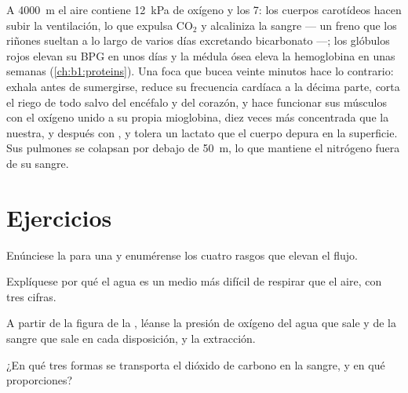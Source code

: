 \begin{example}\label{ex:b1:gas-exchange:altitudediving}
A \qty{4000}{m} el aire contiene \qty{12}{kPa} de oxígeno y los 
\qty{7}{}: los cuerpos carotídeos hacen subir la ventilación, lo que expulsa
$\mathrm{CO_2}$ y alcaliniza la sangre --- un freno que los riñones sueltan
a lo largo de varios días excretando bicarbonato ---; los glóbulos rojos
elevan su BPG en unos días y la médula ósea eleva la hemoglobina en unas
semanas (\cref{ch:b1:proteins}). Una foca que bucea veinte minutos hace lo
contrario: exhala antes de sumergirse, reduce su frecuencia cardíaca a la
décima parte, corta el riego de todo salvo del encéfalo y del corazón, y
hace funcionar sus músculos con el oxígeno unido a su propia mioglobina,
diez veces más concentrada que la nuestra, y después con , y
tolera un lactato que el cuerpo depura en la superficie. Sus pulmones se
colapsan por debajo de \qty{50}{m}, lo que mantiene el nitrógeno fuera de su
sangre.
\end{example}

\section{Ejercicios}

\begin{exercise}[$\star$]\label{exo:b1:gas-exchange:1}
Enúnciese la  para una  y enumérense los
cuatro rasgos que elevan el flujo.
\end{exercise}

\begin{exercise}[$\star$]\label{exo:b1:gas-exchange:2}
Explíquese por qué el agua es un medio más difícil de respirar que el aire,
con tres cifras.
\end{exercise}

\begin{exercise}[$\star$]\label{exo:b1:gas-exchange:3}
A partir de la figura de la , léanse la presión de oxígeno
del agua que sale y de la sangre que sale en cada disposición, y la
extracción.
\end{exercise}

\begin{exercise}[$\star$]\label{exo:b1:gas-exchange:4}
¿En qué tres formas se transporta el dióxido de carbono en la sangre, y en
qué proporciones?
\end{exercise}

